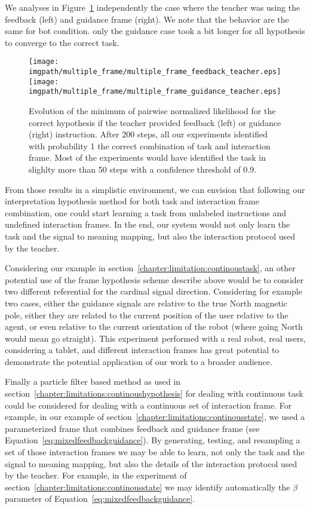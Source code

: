 We analyses in Figure~\ref{fig:multipleframefeedbackvsguidance} independently the case where the teacher was using the feedback (left) and guidance frame (right). We note that the behavior are the same for bot condition. only the guidance case took a bit longer for all hypothesis to converge to the correct task.

\begin{figure}[!ht]
\centering
\texttt{[image: \\imgpath/multiple\_frame/multiple\_frame\_feedback\_teacher.eps]}
\texttt{[image: \\imgpath/multiple\_frame/multiple\_frame\_guidance\_teacher.eps]}
\caption{Evolution of the minimum of pairwise normalized likelihood for the correct hypothesis if the teacher provided feedback (left) or guidance (right) instruction. After 200 steps, all our experiments identified with probability 1 the correct combination of task and interaction frame. Most of the experiments would have identified the task in slighlty more than 50 steps with a confidence threshold of 0.9.}
\label{fig:multipleframefeedbackvsguidance}
\end{figure} 


From those results in a simplistic environment, we can envision that following our interpretation hypothesis method for both task and interaction frame combination, one could start learning a task from unlabeled instructions and undefined interaction frames. In the end, our system would not only learn the task and the signal to meaning mapping, but also the interaction protocol used by the teacher.

Considering our example in section~\ref{chapter:limitation:continoustask}, an other potential use of the frame hypothesis scheme describe above would be to consider two different referential for the cardinal signal direction. Considering for example two cases, either the guidance signals are relative to the true North magnetic pole, either they are related to the current position of the user relative to the agent, or even relative to the current orientation of the robot (where going North would mean go straight). This experiment performed with a real robot, real users, considering a tablet, and different interaction frames has great potential to demonstrate the potential application of our work to a broader audience.

Finally a particle filter based method as used in section~\ref{chapter:limitations:continoushypothesis} for dealing with continuous task could be considered for dealing with a continuous set of interaction frame. For example, in our example of section~\ref{chapter:limitations:continousstate}, we used a parameterized frame that combines feedback and guidance frame (see Equation~\ref{eq:mixedfeedbackguidance}). By generating, testing, and resampling a set of those interaction frames we may be able to learn, not only the task and the signal to meaning mapping, but also the details of the interaction protocol used by the teacher. For example, in the experiment of section~\ref{chapter:limitations:continousstate} we may identify automatically the $\beta$ parameter of Equation~\ref{eq:mixedfeedbackguidance}.